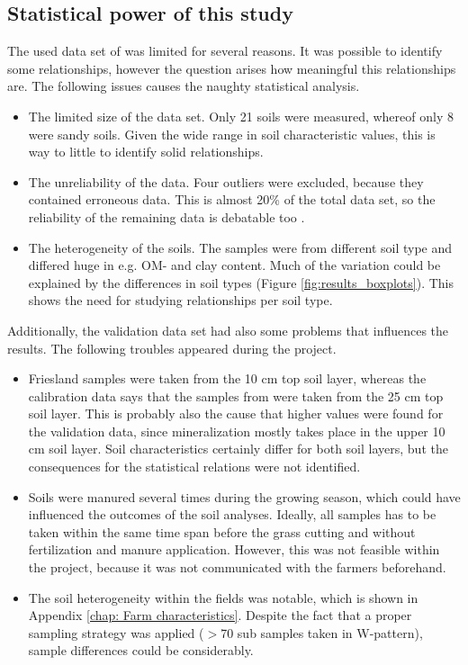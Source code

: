 \documentclass[10pt,twoside,dutch,english]{report}
\begin{document}
\begin{appendices}
   \chapter{Statistical power of this study}
   The used data set of \citet{Echeverri2014} was limited for several reasons. It was possible to identify some relationships, however the question arises how meaningful this relationships are. The following issues causes the naughty statistical analysis. 
		   \begin{itemize}
   	\item The limited size of the data set. Only 21 soils were measured, whereof only 8 were sandy soils.  Given the wide range in soil characteristic values, this is way to little to identify solid relationships.
   	\item The unreliability of the data. Four outliers were excluded, because they contained erroneous data. This is almost 20\% of the total data set, so
   	 the reliability of the remaining data is debatable too . 
   	\item The heterogeneity of the soils. The samples were from different soil type and differed huge in e.g. OM- and clay content. Much of the variation could be explained by the differences in soil types (Figure \ref{fig:results_boxplots}). This shows the need for studying relationships per soil type. 
    \end{itemize} 
   
   Additionally, the validation data set had also some problems that influences the results. The following troubles appeared during the project.
		   \begin{itemize}
	\item Friesland samples were taken from the 10 cm top soil layer, whereas the calibration data says that the samples from \citet{Echeverri2014} were taken from the 25 cm top soil layer. This is probably also the cause that higher values were found for the validation data, since mineralization mostly takes place in the upper 10 cm soil layer. Soil characteristics certainly differ for both soil layers, but the consequences for the statistical relations were not identified. 
   	\item Soils were manured several times during the growing season, which could have influenced the outcomes of the soil analyses. Ideally, all samples has to be taken within the same time span before the grass cutting and without fertilization and manure application. However, this was not feasible within the project, because it was not communicated with the farmers beforehand.
   	\item The soil heterogeneity within the fields was notable, which is shown in Appendix \ref{chap: Farm characteristics}. Despite the fact that a proper sampling strategy was applied ($>$70 sub samples taken in W-pattern), sample differences could be considerably. 
   \end{itemize}
   

\end{appendices}
\end{document}
